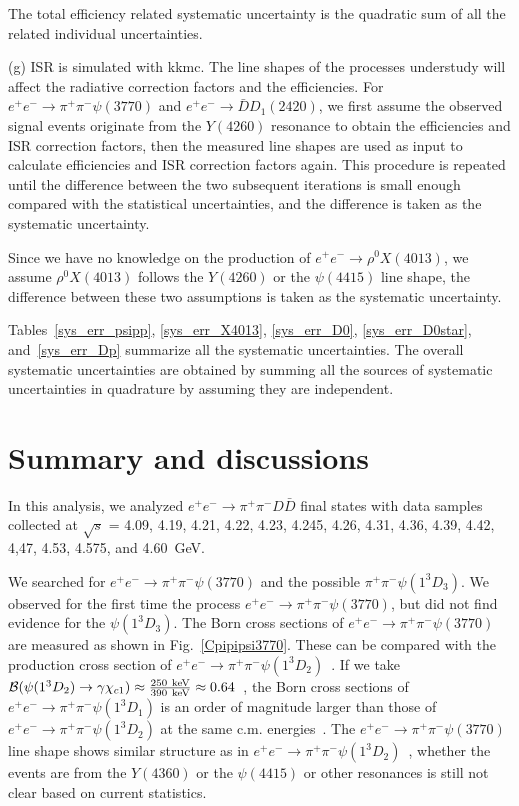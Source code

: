 \documentclass[aps,preprint,superscriptaddress,12pt,tightenlines]{revtex4}
\newcommand{\BR}{{\cal B}}
\newcommand{\EE}{e^+e^-}
\newcommand{\pp}{\pi^+\pi^-}
\newcommand{\ddb}{D\bar{D}}
\begin{document}
The total efficiency related systematic uncertainty is the
quadratic sum of all the related individual uncertainties.

(g) ISR is simulated with {\sc kkmc}. The line shapes of the
processes understudy will affect the radiative correction factors
and the efficiencies. For $e^{+}e^{-}\to \pi^{+}\pi^{-}\psi(3770)$
and $e^{+}e^{-}\to \bar{D}D_{1}(2420)$, we first assume the observed
signal events originate from the $Y(4260)$ resonance to obtain the
efficiencies and ISR correction factors, then the measured line
shapes are used as input to calculate efficiencies and ISR
correction factors again. This procedure is repeated until the
difference between the two subsequent iterations is small enough
compared with the statistical uncertainties, and the difference is
taken as the systematic uncertainty.

Since we have no knowledge on the production of $e^{+}e^{-}\to
\rho^{0}X(4013)$, we assume $\rho^{0}X(4013)$ follows the
$Y(4260)$ or the $\psi(4415)$ line shape, the difference between
these two assumptions is taken as the systematic uncertainty.

Tables~\ref{sys_err_psipp}, \ref{sys_err_X4013}, \ref{sys_err_D0}, \ref{sys_err_D0star},
and~\ref{sys_err_Dp} summarize all the systematic uncertainties.
The overall systematic uncertainties are obtained by summing all
the sources of systematic uncertainties in quadrature by assuming
they are independent.

\section{Summary and discussions}

In this analysis, we analyzed $\EE\to \pp\ddb$ final states with
data samples collected at $\sqrt{s}$ = 4.09, 4.19, 4.21, 4.22,
4.23, 4.245, 4.26, 4.31, 4.36, 4.39, 4.42, 4,47, 4.53, 4.575, and
4.60~GeV.

We searched for $e^{+}e^{-}\to \pp\psi(3770)$ and the possible
$\pp\psi(1^{3}D_{3})$. We observed for the first time the process
$e^{+}e^{-}\to \pi^{+}\pi^{-}\psi(3770)$, but did not find
evidence for the $\psi(1^{3}D_{3})$. The Born cross sections of
$e^{+}e^{-}\to \pi^{+}\pi^{-}\psi(3770)$ are measured as shown in
Fig.~\ref{Cpipipsi3770}. These can be compared with the production
cross section of $\EE\to \pp\psi(1^3D_2)$~\cite{X3823}. If we take
 $\BR(\psi(1^3D_2)\to \gamma\chi_{c1})\approx
 \frac{250~{\rm keV}}{390~{\rm keV}}\approx 0.64$~\cite{BranchX3823},
the Born cross sections of $\EE\to \pp\psi(1^3D_1)$ is an order of
magnitude larger than those of $\EE\to \pp\psi(1^3D_2)$ at the
same c.m. energies~\cite{X3823}. The $e^{+}e^{-}\to \pp\psi(3770)$
line shape shows similar structure as in $\EE\to
\pp\psi(1^3D_2)$~\cite{X3823}, whether the events are from the
$Y(4360)$ or the $\psi(4415)$ or other resonances is still not
clear based on current statistics.
\end{document}
